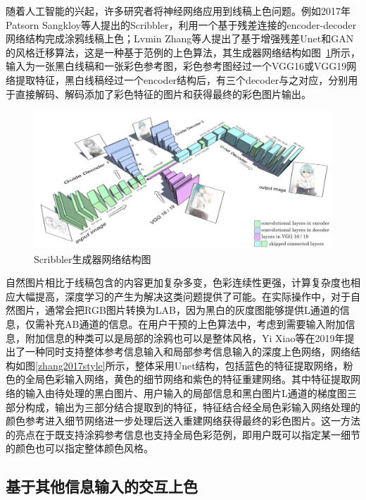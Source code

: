 \documentclass[conference]{IEEEtran}
\begin{document}
随着人工智能的兴起，许多研究者将神经网络应用到线稿上色问题。例如2017年Patsorn Sangkloy等人提出的Scribbler，\cite{sangkloy2017scribbler}利用一个基于残差连接的encoder-decoder网络结构完成涂鸦线稿上色；Lvmin Zhang等人提出了基于增强残差Unet和GAN的风格迁移算法，这是一种基于范例的上色算法，其生成器网络结构如图~\ref{sangkloy2017scribbler}所示，输入为一张黑白线稿和一张彩色参考图，彩色参考图经过一个VGG16或VGG19网络提取特征，黑白线稿经过一个encoder结构后，有三个decoder与之对应，分别用于直接解码、解码添加了彩色特征的图片和获得最终的彩色图片输出。

\begin{figure}[h]
\centerline{\includegraphics[totalheight = 1.6in]{sangkloy2017scribbler.png}}
\caption{Scribbler生成器网络结构图}
\label{sangkloy2017scribbler}
\end{figure}

自然图片相比于线稿包含的内容更加复杂多变，色彩连续性更强，计算复杂度也相应大幅提高，深度学习的产生为解决这类问题提供了可能。在实际操作中，对于自然图片，通常会把RGB图片转换为LAB，因为黑白的灰度图能够提供L通道的信息，仅需补充AB通道的信息。在用户干预的上色算法中，考虑到需要输入附加信息，附加信息的种类可以是局部的涂鸦也可以是整体风格，Yi Xiao等在2019年提出了一种同时支持整体参考信息输入和局部参考信息输入的深度上色网络\cite{zhang2017style}，网络结构如图\ref{zhang2017style}所示，整体采用Unet结构，包括蓝色的特征提取网络，粉色的全局色彩输入网络，黄色的细节网络和紫色的特征重建网络。其中特征提取网络的输入由待处理的黑白图片、用户输入的局部信息和黑白图片L通道的梯度图三部分构成，输出为三部分结合提取到的特征，特征结合经全局色彩输入网络处理的颜色参考进入细节网络进一步处理后送入重建网络获得最终的彩色图片。这一方法的亮点在于既支持涂鸦参考信息也支持全局色彩范例，即用户既可以指定某一细节的颜色也可以指定整体颜色风格。


\subsection{基于其他信息输入的交互上色}
\end{document}
